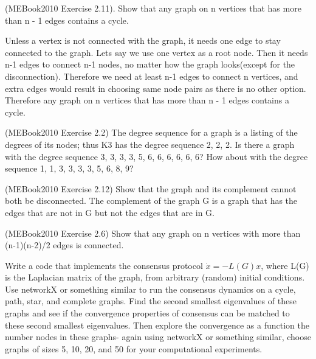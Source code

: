 \documentclass{article}
\begin{document}
\begin{problem}
    (MEBook2010 Exercise 2.11). Show that any graph on n vertices that has more than n - 1 edges contains a cycle.
\end{problem}
    Unless a vertex is not connected with the graph, it needs one edge to stay connected to the graph. Lets say we use one vertex as a root node. Then it needs n-1 edges to connect n-1 nodes, no matter how the graph looks(except for the disconnection). Therefore we need at least n-1 edges to connect n vertices, and extra edges would result in choosing same node pairs as there is no other option. Therefore any graph on n vertices that has more than n - 1 edges contains a cycle.
    
\begin{problem}
    (MEBook2010 Exercise 2.2) The degree sequence for a graph is a listing of the degrees of its nodes; thus K3 has the degree sequence 2, 2, 2. Is there a graph with the degree sequence 3, 3, 3, 3, 5, 6, 6, 6, 6, 6, 6? How about with the degree sequence 1, 1, 3, 3, 3, 3, 5, 6, 8, 9?

\end{problem}

\begin{problem}
    (MEBook2010 Exercise 2.12) Show that the graph and its complement cannot both be disconnected. The complement of the graph G is a graph that has the edges that are not in G but not the edges that are in G.
        
\end{problem}

\begin{problem}
    (MEBook2010 Exercise 2.6) Show that any graph on n vertices with more than (n-1)(n-2)/2 edges is connected.
  
\end{problem}

\begin{problem}
    Write a code that implements the consensus protocol  $\dot{x}=-L(G) x$, where L(G) is the Laplacian matrix of the graph,  from arbitrary (random) initial conditions. Use networkX or something similar to run the consensus dynamics on a cycle, path, star, and complete graphs. Find the second smallest eigenvalues of these graphs and see if the convergence properties of consensus  can be matched to these second smallest eigenvalues. Then explore the convergence as a function the number  nodes in these graphs- again using networkX or something similar, choose graphs of sizes 5, 10, 20, and 50 for your computational experiments.
\end{problem}
\end{document}
